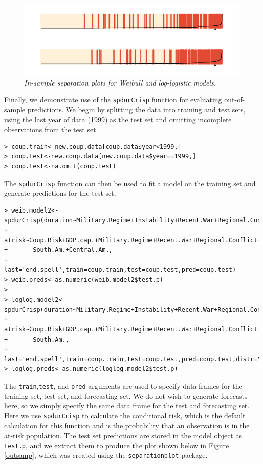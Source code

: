 \documentclass[]{article}
\begin{document}
\begin{figure}[htbp!]
\centering
\includegraphics[width=5in]{in-sample.pdf}
\caption{{\em In-sample separation plots for Weibull and log-logistic models.}} \label{insamp}
\end{figure}

Finally, we demonstrate use of the \texttt{spdurCrisp} function for
evaluating out-of-sample predictions. We begin by splitting the data
into training and test sets, using the last year of data (1999) as the
test set and omitting incomplete observations from the test set. \small

\begin{verbatim}
> coup.train<-new.coup.data[coup.data$year<1999,]
> coup.test<-new.coup.data[new.coup.data$year==1999,]
> coup.test<-na.omit(coup.test)
\end{verbatim}

\normalsize
The \texttt{spdurCrisp} function can then be used to fit a model on the
training set and generate predictions for the test set. \small

\begin{verbatim}
> weib.model2<-spdurCrisp(duration~Military.Regime+Instability+Recent.War+Regional.Conflict,
+       atrisk~Coup.Risk+GDP.cap.+Military.Regime+Recent.War+Regional.Conflict+
+       South.Am.+Central.Am.,
+       last='end.spell',train=coup.train,test=coup.test,pred=coup.test)
> weib.preds<-as.numeric(weib.model2$test.p)
>
> loglog.model2<-spdurCrisp(duration~Military.Regime+Instability+Recent.War+Regional.Conflict,
+       atrisk~Coup.Risk+GDP.cap.+Military.Regime+Recent.War+Regional.Conflict+
+       South.Am.,
+       last='end.spell',train=coup.train,test=coup.test,pred=coup.test,distr="loglog")
> loglog.preds<-as.numeric(loglog.model2$test.p)
\end{verbatim}

\normalsize
The \texttt{train},\texttt{test}, and \texttt{pred} arguments are used
to specify data frames for the training set, test set, and forecasting
set. We do not wish to generate forecasts here, so we simply specify the
same data frame for the test and forecasting set. Here we use
\texttt{spdurCrisp} to calculate the conditional risk, which is the
default calculation for this function and is the probability that an
observation is in the at-risk population. The test set predictions are
stored in the model object as \texttt{test.p}, and we extract them to
produce the plot shown below in Figure \ref{outsamp}, which was created
using the \texttt{separationplot} package. \small
\end{document}
